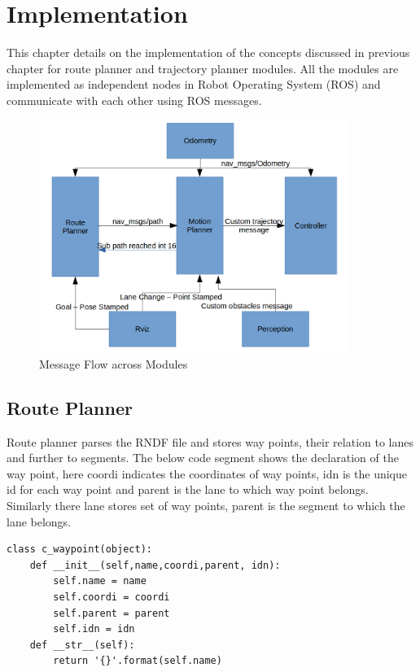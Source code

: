 \chapter{Implementation}
\label{implementation}
This chapter details on the implementation of the concepts discussed in previous chapter for route planner and trajectory planner modules. All the modules are implemented as independent nodes in Robot Operating System (ROS) and communicate with each other using ROS messages.

\begin{figure}
	\centering
	\includegraphics[width=0.9\textwidth]{Images/implementation/message_flow.png}
	\caption{Message Flow across Modules}
	\label{message_flow}
\end{figure}


\section{Route Planner}
Route planner parses the RNDF file and stores way points, their relation to lanes and further to segments. The below code segment shows the declaration of the way point, here coordi indicates the coordinates of way points, idn is the unique id for each way point and parent is the lane to which way point belongs. Similarly there lane stores set of way points, parent is the segment to which the lane belongs. 

\begin{lstlisting}
class c_waypoint(object):
	def __init__(self,name,coordi,parent, idn):
		self.name = name
		self.coordi = coordi
		self.parent = parent
		self.idn = idn
	def __str__(self):
		return '{}'.format(self.name)

\end{lstlisting}



